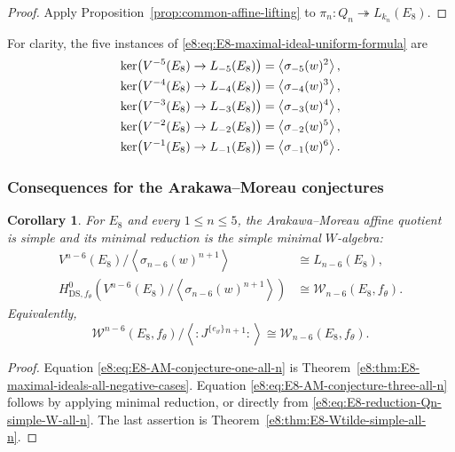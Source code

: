 \documentclass[11pt,reqno]{amsart}
\newtheorem{corollary}[theorem]{Corollary}
\theoremstyle{definition}
\theoremstyle{remark}
\providecommand{\W}{\mathcal{W}}
\providecommand{\DS}{\mathrm{DS}}
\begin{document}
\begin{proof}
Apply Proposition~\ref{prop:common-affine-lifting} to
$\pi_n:Q_n\twoheadrightarrow L_{k_n}(E_8)$.
\end{proof}

For clarity, the five instances of
\eqref{e8:eq:E8-maximal-ideal-uniform-formula} are
\begin{align*}
  \ker\!\left(V^{-5}(E_8)\to L_{-5}(E_8)\right)
  &=\left\langle\sigma_{-5}(w)^2\right\rangle,
  \notag\\
  \ker\!\left(V^{-4}(E_8)\to L_{-4}(E_8)\right)
  &=\left\langle\sigma_{-4}(w)^3\right\rangle,
  \notag\\
  \ker\!\left(V^{-3}(E_8)\to L_{-3}(E_8)\right)
  &=\left\langle\sigma_{-3}(w)^4\right\rangle,
  \notag\\
  \ker\!\left(V^{-2}(E_8)\to L_{-2}(E_8)\right)
  &=\left\langle\sigma_{-2}(w)^5\right\rangle,
  \notag\\
  \ker\!\left(V^{-1}(E_8)\to L_{-1}(E_8)\right)
  &=\left\langle\sigma_{-1}(w)^6\right\rangle.
\end{align*}

\subsubsection{Consequences for the Arakawa--Moreau conjectures}


\begin{corollary}

For $E_8$ and every $1\le n\le5$, the Arakawa--Moreau affine quotient is
simple and its minimal reduction is the simple minimal $W$-algebra:
\begin{align}
  V^{n-6}(E_8)
  \Big/\left\langle\sigma_{n-6}(w)^{n+1}\right\rangle
  &\cong L_{n-6}(E_8),
  \label{e8:eq:E8-AM-conjecture-one-all-n}\\
  H^0_{\DS,f_\theta}\!\left(
    V^{n-6}(E_8)
    \Big/\left\langle\sigma_{n-6}(w)^{n+1}\right\rangle
  \right)
  &\cong\W_{n-6}(E_8,f_\theta).
  \label{e8:eq:E8-AM-conjecture-three-all-n}
\end{align}
Equivalently,
\begin{equation*}
  \W^{n-6}(E_8,f_\theta)
  \Big/\left\langle:J^{\{e_\vartheta\}}{}^{n+1}:\right\rangle
  \cong\W_{n-6}(E_8,f_\theta).
\end{equation*}
\end{corollary}

\begin{proof}
Equation \eqref{e8:eq:E8-AM-conjecture-one-all-n} is
Theorem~\ref{e8:thm:E8-maximal-ideals-all-negative-cases}.  Equation
\eqref{e8:eq:E8-AM-conjecture-three-all-n} follows by applying minimal
reduction, or directly from \eqref{e8:eq:E8-reduction-Qn-simple-W-all-n}.
The last assertion is Theorem~\ref{e8:thm:E8-Wtilde-simple-all-n}.
\end{proof}
\end{document}
